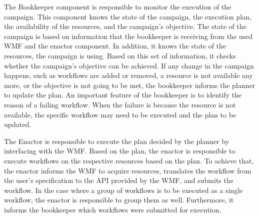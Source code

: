 The Bookkeeper component is responsible to monitor the execution of the campaign.
This component knows the state of the campaign, the execution plan, the availability of the resources, and the campaign's objective.
The state of the campaign is based on information that the bookkeeper is receiving from the used WMF and the enactor component.
In addition, it knows the state of the resources, the campaign is using.
Based on this set of information, it checks whether the campaign's objective can be achieved.
If any change in the campaign happens, such as workflows are added or removed, a resource is not available any more, or the objective is not going to be met, the bookkeeper informs the planner to update the plan.
An important feature of the bookkeeper is to identify the reason of a failing workflow.
When the failure is because the resource is not available, the specific workflow may need to be executed and the plan to be updated.

The Enactor is responsible to execute the plan decided by the planner by interfacing with the WMF.
Based on the plan, the enactor is responsible to execute workflows on the respective resources based on the plan.
To achieve that, the enactor informs the WMF to acquire resources, translates the workflow from the user's specification to the API provided by the WMF, and submits the workflow.
In the case where a group of workflows is to be executed as a single workflow, the enactor is responsible to group them as well.
Furthermore, it informs the bookkeeper which workflows were submitted for execution.


